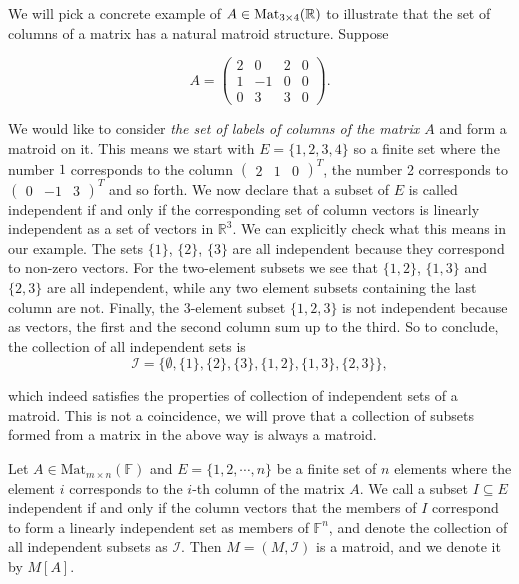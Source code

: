 \begin{exmp}
    

 
 We will pick a concrete example of $A \in  \operatorname{Mat}_{3 \times 4}(\mathbb{R})$ to illustrate that the set of columns of a matrix has a natural matroid structure. Suppose

$$A = \begin{pmatrix}

2 & 0 & 2 & 0 \\
1 & -1 & 0 & 0 \\
0 & 3 & 3 & 0


\end{pmatrix}.$$

We would like to consider \textit{the set of labels of columns of the matrix $A$} and form a matroid on it. This means we start with $E = \{1,2,3,4\}$ so a finite set where the number $1$ corresponds to the column $\begin{pmatrix} 2 & 1 & 0 \end{pmatrix} ^ T$, the number 2 corresponds to $\begin{pmatrix}  0 & -1 & 3  \end{pmatrix} ^ T$ and so forth. We now declare that a subset of $E$ is called independent if and only if the corresponding set of column vectors is linearly independent as a set of vectors in $\mathbb{R}^3$. We can explicitly check what this means in our example. The sets $\{1\}$, $\{2\}$, $\{3\}$ are all independent because they correspond to non-zero vectors. For the two-element subsets we see that $\{1,2\}$, $\{1,3\}$ and $\{2,3\}$ are all independent, while any two element subsets containing the last column are not. Finally, the 3-element subset $\{1,2,3\}$ is not independent because as vectors, the first and the second column sum up to the third. So to conclude, the collection of all independent sets is
$$\mathcal{I} = \{\emptyset, \{1\}, \{2\}, \{3\}, \{1,2\}, \{1,3\}, \{2,3\} \},$$

which indeed satisfies the properties of collection of independent sets of a matroid. This is not a coincidence, we will prove that a collection of subsets formed from a matrix in the above way is always a matroid.

\end{exmp}


\begin{theorem}

    Let $A \in \mathrm{Mat} _{m \times n}(\mathbb{F})$ and $E = \{1, 2, \cdots, n\}$ be a finite set of $n$ elements where the element $i$ corresponds to the $i$-th column of the matrix $A$. We call a subset $I \subseteq E$ independent if and only if the column vectors that the members of $I$ correspond to form a linearly independent set as members of $\mathbb{F}^n$, and denote the collection of all independent subsets as $\mathcal{I}$. Then $M = (M, \mathcal{I})$ is a matroid, and we denote it by $M[A]$.
    
\end{theorem}

